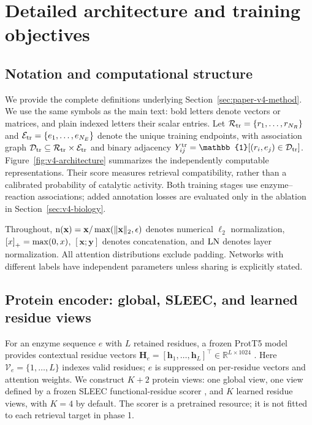 \section{Detailed architecture and training objectives}
\label{app:paper-specification}
\label{sec:v4-method}

\subsection{Notation and computational structure}
\label{sec:v4-problem}
We provide the complete definitions underlying Section~\ref{sec:paper-v4-method}.
We use the same symbols as the main text: bold letters denote vectors or
matrices, and plain indexed letters their scalar entries.
Let $\mathcal{R}_{\mathrm{tr}}=\{r_1,\ldots,r_{N_R}\}$ and
$\mathcal{E}_{\mathrm{tr}}=\{e_1,\ldots,e_{N_E}\}$ denote the unique training endpoints, with
association graph $\mathcal{D}_{\mathrm{tr}}\subseteq\mathcal{R}_{\mathrm{tr}}\times\mathcal{E}_{\mathrm{tr}}$ and binary adjacency
$Y^{\mathrm{tr}}_{ij}=\mathbb{1}[(r_i,e_j)\in\vD]$.
Figure~\ref{fig:v4-architecture} summarizes the independently computable
representations. Their score measures retrieval compatibility, rather than
a calibrated probability of catalytic activity. Both training stages use
enzyme--reaction associations; added annotation losses are evaluated only
in the ablation in Section~\ref{sec:v4-biology}.

Throughout, $\operatorname{n}(\mathbf{x})=\mathbf{x}/\max(\lVert\mathbf{x}\rVert_2,\epsilon)$ denotes numerical
$\ell_2$ normalization, $\left[x\right]_{+}=\max(0,x)$, $[\mathbf{x};\mathbf{y}]$ denotes concatenation,
and $\operatorname{LN}$ denotes layer normalization. All attention distributions exclude
padding. Networks with different labels have independent parameters unless
sharing is explicitly stated.



\subsection{Protein encoder: global, SLEEC, and learned residue views}
\label{sec:v4-protein}
For an enzyme sequence $e$ with $L$ retained residues, a frozen ProtT5 model
provides contextual residue vectors
$\mathbf{H}_e=[\mathbf{h}_1,\ldots,\mathbf{h}_L]^\top\in\mathbb{R}^{L\times1024}$
\citep{elnaggar2022prottrans}. Here $\mathcal V_e=\{1,\ldots,L\}$ indexes
valid residues; $e$ is suppressed on per-residue vectors and attention weights.
We construct $K+2$ protein views: one global
view, one view defined by a frozen SLEEC functional-residue scorer
\citep{gong2026sleec}, and $K$ learned residue views, with $K=4$ by default. The scorer is a
pretrained resource; it is not fitted to each retrieval target in phase 1.

